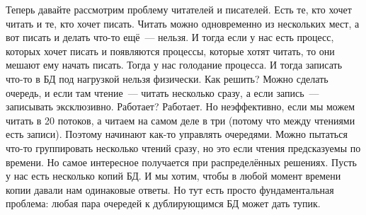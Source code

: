 \documentclass{article}
\begin{document}
    Теперь давайте рассмотрим проблему читателей и писателей. Есть те, кто хочет читать и те, кто хочет писать. Читать можно одновременно из нескольких мест, а вот писать и делать что-то ещё~--- нельзя. И тогда если у нас есть процесс, которых хочет писать и появляются процессы, которые хотят читать, то они мешают ему начать писать. Тогда у нас голодание процесса. И тогда записать что-то в БД под нагрузкой нельзя физически. Как решить? Можно сделать очередь, и если там чтение~--- читать несколько сразу, а если запись~--- записывать эксклюзивно. Работает? Работает. Но неэффективно, если мы можем читать в 20 потоков, а читаем на самом деле в три (потому что между чтениями есть записи). Поэтому начинают как-то управлять очередями. Можно пытаться что-то группировать несколько чтений сразу, но это если чтения предсказуемы по времени. Но самое интересное получается при распределённых решениях. Пусть у нас есть несколько копий БД. И мы хотим, чтобы в любой момент времени копии давали нам одинаковые ответы. Но тут есть просто фундаментальная проблема: любая пара очередей к дублирующимся БД может дать тупик.
\end{document}

